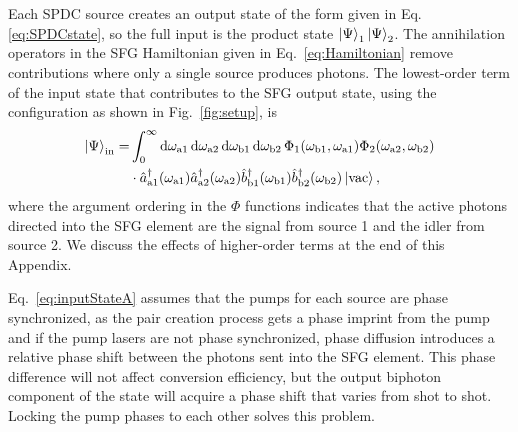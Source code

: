 \documentclass[twocolumn,amssymb, nobibnotes, showpacs, aps, pra,10pt]{revtex4-1}
\newcommand*{\waone}{\omega_{\textrm{a}1}}
\newcommand*{\watwo}{\omega_{\textrm{a}2}}
\newcommand*{\wbone}{\omega_{\textrm{b}1}}
\newcommand*{\wbtwo}{\omega_{\textrm{b}2}}
\newcommand*\diff{\mathop{}\!\mathrm{d}}
\begin{document}
Each SPDC source creates an output state of the form given in Eq. \eqref{eq:SPDCstate}, so the full input is the product state $\ket{\Psi}_1 \ket{\Psi}_2$. The annihilation operators in the SFG Hamiltonian given in Eq.\ \eqref{eq:Hamiltonian} remove contributions where only a single source produces photons. The lowest-order term of the input state that contributes to the SFG output state, using the configuration as shown in Fig.\ \ref{fig:setup}, is 
\begin{align} \label{eq:inputStateA}
\ket{\Psi}_{\text{in}} = &\int_0^\infty   \diff \waone \diff \watwo \diff \wbone \diff \wbtwo \, \Phi_1 (\wbone, \waone) \Phi_2 (\watwo, \wbtwo) \nonumber \\
& \cdot \hat{a}_{\text{a1}}^\dagger (\waone) \hat{a}_{\text{a2}}^\dagger (\watwo) \hat{b}_{\text{b1}}^\dagger (\wbone) \hat{b}_{\text{b2}}^\dagger (\wbtwo) \ket{\text{vac}} ,
\end{align}
where the argument ordering in the $\Phi$ functions indicates that the active photons directed into the SFG element are the signal from source 1 and the idler from source 2. We discuss the effects of higher-order terms at the end of this Appendix.

Eq.\ \eqref{eq:inputStateA} assumes that the pumps for each source are phase synchronized, as the pair creation process gets a phase imprint from the pump and if the pump lasers are not phase synchronized, phase diffusion introduces a relative phase shift between the photons sent into the SFG element. This phase difference will not affect conversion efficiency, but the output biphoton component of the state will acquire a phase shift that varies from shot to shot. Locking the pump phases to each other solves this problem.
\end{document}
